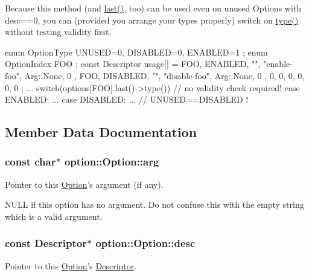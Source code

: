 \-Because this method (and \hyperlink{classoption_1_1_option_afe2aff68191e55b59c53fac3dbbcd7c3}{last()}, too) can be used even on unused \-Options with desc==0, you can (provided you arrange your types properly) switch on \hyperlink{classoption_1_1_option_a6560fa0526e2affd87d5a10622336af4}{type()} without testing validity first. 
\begin{DoxyCode}
 enum OptionType { UNUSED=0, DISABLED=0, ENABLED=1 };
 enum OptionIndex { FOO };
 const Descriptor usage[] = {
   { FOO, ENABLED,  "", "enable-foo",  Arg::None, 0 },
   { FOO, DISABLED, "", "disable-foo", Arg::None, 0 },
   { 0, 0, 0, 0, 0, 0 } };
 ...
 switch(options[FOO].last()->type()) // no validity check required!
 {
   case ENABLED: ...
   case DISABLED: ...  // UNUSED==DISABLED !
 }
\end{DoxyCode}
 

\subsection{\-Member \-Data \-Documentation}
\hypertarget{classoption_1_1_option_a402be734987458364b0f473acae36238}{
\subsubsection[{arg}]{\setlength{\rightskip}{0pt plus 5cm}const char$\ast$ {\bf option\-::\-Option\-::arg}}}\label{classoption_1_1_option_a402be734987458364b0f473acae36238}


\-Pointer to this \hyperlink{classoption_1_1_option}{\-Option}'s argument (if any). 

\-N\-U\-L\-L if this option has no argument. \-Do not confuse this with the empty string which is a valid argument. \hypertarget{classoption_1_1_option_af8d664a7b5de1425008b1812a90a0c23}{
\subsubsection[{desc}]{\setlength{\rightskip}{0pt plus 5cm}const {\bf \-Descriptor}$\ast$ {\bf option\-::\-Option\-::desc}}}\label{classoption_1_1_option_af8d664a7b5de1425008b1812a90a0c23}


\-Pointer to this \hyperlink{classoption_1_1_option}{\-Option}'s \hyperlink{structoption_1_1_descriptor}{\-Descriptor}. 

